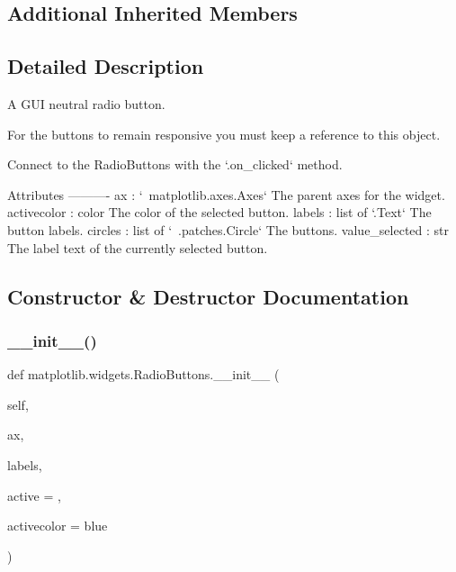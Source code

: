 \subsection*{Additional Inherited Members}


\subsection{Detailed Description}
\begin{DoxyVerb}A GUI neutral radio button.

For the buttons to remain responsive you must keep a reference to this
object.

Connect to the RadioButtons with the `.on_clicked` method.

Attributes
----------
ax : `~matplotlib.axes.Axes`
    The parent axes for the widget.
activecolor : color
    The color of the selected button.
labels : list of `.Text`
    The button labels.
circles : list of `~.patches.Circle`
    The buttons.
value_selected : str
    The label text of the currently selected button.
\end{DoxyVerb}
 

\subsection{Constructor \& Destructor Documentation}
\mbox{\label{classmatplotlib_1_1widgets_1_1RadioButtons_aa818136aaa788c963d2793e0dbad9012}} 
\subsubsection{\texorpdfstring{\+\_\+\+\_\+init\+\_\+\+\_\+()}{\_\_init\_\_()}}
{\footnotesize\ttfamily def matplotlib.\+widgets.\+Radio\+Buttons.\+\_\+\+\_\+init\+\_\+\+\_\+ (\begin{DoxyParamCaption}\item[{}]{self,  }\item[{}]{ax,  }\item[{}]{labels,  }\item[{}]{active = {},  }\item[{}]{activecolor = {\ttfamily \textquotesingle{}blue\textquotesingle{}} }\end{DoxyParamCaption})}


